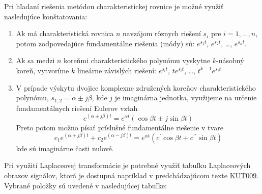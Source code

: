 \documentclass[a4paper, 10pt, ]{article}
\begin{document}
Pri hľadaní riešenia metódou charakteristickej rovnice je možné využiť nasledujúce konštatovania:
\begin{enumerate}[leftmargin=0pt, labelsep=4mm, itemsep=0pt]
    \item Ak má charakteristická rovnica $n$ navzájom rôznych riešení $s_i$ pre $i = 1, \ldots, n$, potom zodpovedajúce fundamentálne riešenia (módy) sú: $e^{s_1 t}$, $e^{s_2 t}$, \ldots, $e^{s_n t}$.
    \item Ak sa medzi $n$ koreňmi charakteristického polynómu vyskytne $k$-násobný koreň, vytvoríme $k$ lineárne závislých riešení: $e^{s_i t}$, $t e^{s_i t}$, \ldots, $t^{k-1} e^{s_i t}$
    \item V prípade výskytu dvojice komplexne združených koreňov charakteristického polynómu, $s_{1,2} = \alpha \pm j \beta$, kde $j$ je imaginárna jednotka, využijeme na určenie fundamentálnych riešení Eulerov vzťah
    \begin{equation*}
        e^{\left(\alpha \pm j \beta\right)t} = e^{\alpha t} \left( \cos\beta t \pm j \sin \beta t\right)
    \end{equation*}
    Preto potom možno písať príslušné fundamentálne riešenie v tvare
    \begin{equation*}
        c_1 e^{\left(\alpha + j \beta\right)t} + c_2 e^{\left(\alpha - j \beta\right)t} = e^{\alpha t} \left( c^\prime \cos\beta t + c^{\prime\prime} \sin \beta t\right)
    \end{equation*}
    kde sú imaginárne časti nulové.
\end{enumerate}

Pri využití Laplaceovej transformácie je potrebné využiť tabuľku Laplaceových obrazov signálov, ktorá je dostupná napríklad v predchádzajúcom texte \href{run:../../../KUT_items/KUT009/TeX/KUT009.pdf}{\sffamily KUT009}. Vybrané položky sú uvedené v nasledujúcej tabuľke:

\medskip

\newcommand{\Laplace}[1]{\ensuremath{\mathcal{L}{\left\{#1\right\}}}}
\newcommand{\InvLap}[1]{\ensuremath{\mathcal{L}^{-1}{\left\{#1\right\}}}}
\end{document}
